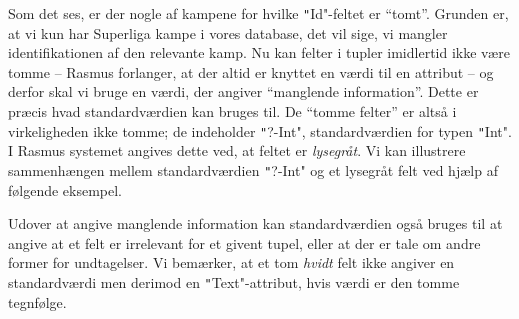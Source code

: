 \documentclass{article}
\newcounter{eks}
\begin{document}
\begin{center}
\end{center}
Som det ses, er der nogle af kampene for hvilke \texttt"Id"-feltet
er ``tomt''. Grunden er, at vi kun har Superliga kampe i vores
database, det vil sige, vi mangler identifikationen af den relevante
kamp. Nu kan felter i tupler imidlertid ikke v\ae{}re tomme --
{\sc Rasmus} forlanger, at der altid er knyttet en v\ae{}rdi til
en attribut -- og derfor skal vi bruge en v\ae{}rdi, der angiver
``manglende information''. Dette er pr\ae{}cis hvad standardv\ae{}rdien
kan bruges til. De ``tomme felter'' er alts\aa{} i virkeligheden ikke
tomme; de indeholder \texttt"?-Int", standardv\ae{}rdien for typen \texttt"Int".
I {\sc Rasmus} systemet angives dette ved, at feltet er {\em lysegr\aa{}t}.
Vi kan illustrere sammenh\ae{}ngen mellem standardv\ae{}rdien
\texttt"?-Int" og et lysegr\aa{}t felt ved hj\ae{}lp af f\o{}lgende eksempel.


Udover at angive manglende information kan standardv\ae{}rdien
ogs\aa{} brug\-es til at angive at et felt er irrelevant for et
givent tupel, eller at der er tale om andre former for undtagelser.
Vi bem\ae{}rker, at et tom {\em hvidt\/} felt ikke angiver en
standardv\ae{}rdi men derimod en \texttt"Text"-attribut, hvis v\ae{}rdi
er den tomme tegnf\o{}lge.
\end{document}
